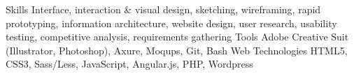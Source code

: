   \begin{cvskills}
    \cvskill
    	{Skills}
         {Interface, interaction \& visual design, sketching, wireframing, rapid prototyping, information architecture, website design, user research, usability testing, competitive analysis, requirements gathering}
	\cvskill
		{Tools}
		{Adobe Creative Suit (Illustrator, Photoshop), Axure, Moqups, Git, Bash}
  	\cvskill
		{Web Technologies}
		{HTML5, CSS3, Sass/Less, JavaScript, Angular.js, PHP, Wordpress}
  \end{cvskills}